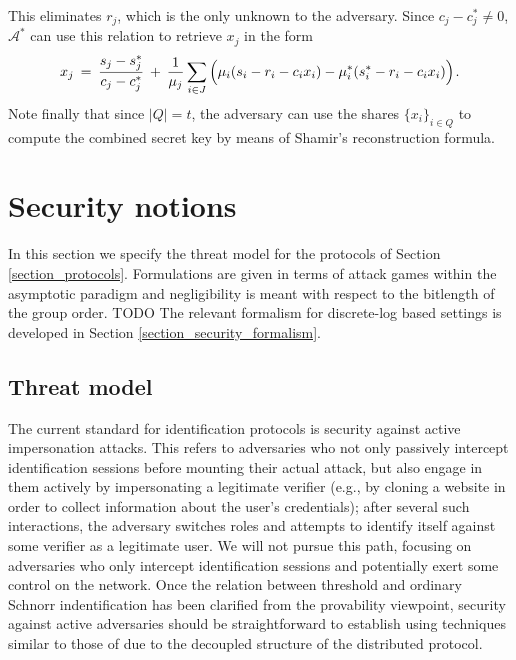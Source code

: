 \documentclass[psamsfonts, reqno]{amsart}
\theoremstyle{definition}
\theoremstyle{remark}
\numberwithin{equation}{section}
\begin{document}
This eliminates $r_j$,
which is the only unknown to the adversary.
Since $c_j - c_j^* \neq 0$,
$\mathcal{A}^*$ can use this relation to retrieve
$x_j$ in the form
\vspace{5pt}
\begin{equation}\label{orst_key_recovery}
x_j
\hspace{2pt}
=
\hspace{2pt}
\frac{s_j - s_j^*}{c_j - c_j^*}
\hspace{2pt}
+
\hspace{2pt}
\frac{1}{\mu_j} \sum_{i \in J}
\hspace{0pt}
\Big(
	\mu_i (s_i - r_i - c_i x_i) -
	\mu_i^* (s_i^* - r_i - c_i x_i)
\Big)\hspace{1pt}.
\vspace{5pt}
\end{equation}
\noindent
Note finally that since $|Q| = t$, the adversary can use
the shares $\{x_i\}_{i \in Q}$
to compute the combined secret key
by means of Shamir's reconstruction formula.

\section{Security notions}\label{section_security_notions}

\noindent
In this section we specify the threat model for the protocols
of Section \ref{section_protocols}.
Formulations are given in terms of attack games within the
asymptotic paradigm and negligibility
is meant with respect to the bitlength
of the group order. TODO The relevant formalism
for discrete-log based settings
is developed in Section \ref{section_security_formalism}.


\subsection{Threat model}\label{section_threat_model}

The current standard for identification protocols is
security against active impersonation attacks. This refers to
adversaries who not only passively intercept identification
sessions before mounting their actual attack,
but also engage in them actively by impersonating
a legitimate verifier (e.g., by cloning a website in order
to collect information about the user's credentials);
after several such interactions, the adversary switches roles
and attempts to identify itself against some verifier as a
legitimate user.
We will not pursue this path, focusing
on adversaries who only intercept
identification sessions and potentially exert
some control on the network.
Once the relation between threshold and ordinary
Schnorr indentification has been clarified
from the provability viewpoint,
security against active adversaries should be straightforward
to establish using techniques similar to those
of \cite{paper_bellare_palacio}
due to the decoupled structure of the distributed protocol.
\end{document}
